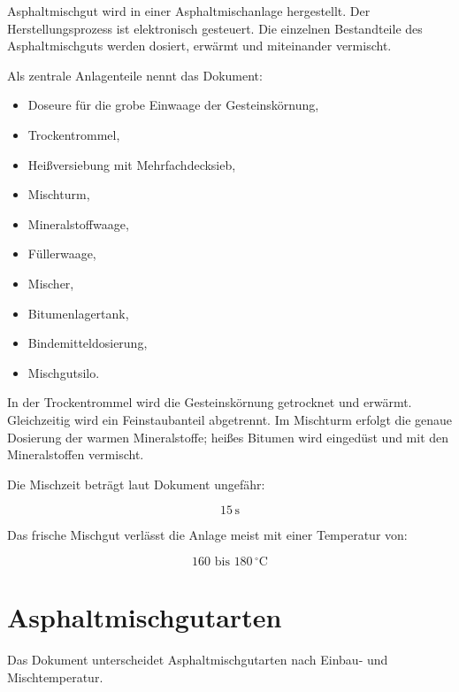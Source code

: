 \documentclass[
  12pt,
  a4paper,
  oneside
]{scrreprt}
\begin{document}
Asphaltmischgut wird in einer Asphaltmischanlage hergestellt. Der
Herstellungsprozess ist elektronisch gesteuert. Die einzelnen
Bestandteile des Asphaltmischguts werden dosiert, erwärmt und
miteinander vermischt.


Als zentrale Anlagenteile nennt das Dokument:

\begin{itemize}
  \item Doseure für die grobe Einwaage der Gesteinskörnung,
  \item Trockentrommel,
  \item Heißversiebung mit Mehrfachdecksieb,
  \item Mischturm,
  \item Mineralstoffwaage,
  \item Füllerwaage,
  \item Mischer,
  \item Bitumenlagertank,
  \item Bindemitteldosierung,
  \item Mischgutsilo.
\end{itemize}



In der Trockentrommel wird die Gesteinskörnung getrocknet und erwärmt.
Gleichzeitig wird ein Feinstaubanteil abgetrennt. Im Mischturm erfolgt
die genaue Dosierung der warmen Mineralstoffe; heißes Bitumen wird
eingedüst und mit den Mineralstoffen vermischt.


Die Mischzeit beträgt laut Dokument ungefähr:

\begin{equation}
  15\,\mathrm{s}
\end{equation}

Das frische Mischgut verlässt die Anlage meist mit einer Temperatur von:

\begin{equation}
  160 \text{ bis } 180\,^\circ\mathrm{C}
\end{equation}



\section{Asphaltmischgutarten}

Das Dokument unterscheidet Asphaltmischgutarten nach Einbau- und
Mischtemperatur.
\end{document}
